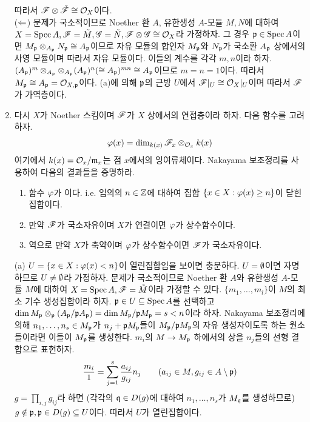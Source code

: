 \begin{enumerate}[label=\tb{5.\arabic*.},itemindent=0mm,itemsep=4mm]
	따라서 $\mathscr{F}\otimes\check{\mathscr{F}}\cong\mathcal{O}_X$이다.\\
	($\Leftarrow$) 문제가 국소적이므로 Noether 환 $A$, 유한생성 $A$-모듈 $M,N$에 대하여
	$X=\operatorname{Spec} A,\mathscr{F}=\tilde M,\mathscr{G}=\tilde N,\mathscr{F}\otimes\mathscr{G}\cong\mathcal{O}_X$라 가정하자.
	그 경우 $\mathfrak{p}\in\operatorname{Spec} A$이면 $M_{\mathfrak{p}}\otimes_{A_{\mathfrak{p}}}N_{\mathfrak{p}}\cong A_{\mathfrak{p}}$이므로
	자유 모듈의 합인자 $M_{\mathfrak{p}}$와 $N_{\mathfrak{p}}$가 국소환 $A_{\mathfrak{p}}$ 상에서의 사영 모듈이며 따라서 자유 모듈이다.
	이들의 계수를 각각 $m,n$이라 하자.
	$(A_{\mathfrak{p}})^m\otimes_{A_{\mathfrak{p}}}\otimes_{A_{\mathfrak{p}}}(A_{\mathfrak{p}})^n(\cong A_{\mathfrak{p}})^{mn}\cong A_{\mathfrak{p}}$이므로 $m=n=1$이다.
	따라서 $M_{\mathfrak{p}}\cong A_{\mathfrak{p}}=\mathcal{O}_{X,\mathfrak{p}}$이다.
	(a)에 의해 $\mathfrak{p}$의 근방 $U$에서 $\mathscr{F}|_U\cong\mathcal{O}_X|_U$이며 따라서 $\mathscr{F}$가 가역층이다.
	\item 다시 $X$가 Noether 스킴이며 $\mathscr{F}$가 $X$ 상에서의 연접층이라 하자. 다음 함수를 고려하자.
	$$\varphi(x)=\dim_{k(x)}\mathscr{F}_x\otimes_{\mathcal{O}_x}k(x)$$
	여기에서 $k(x)=\mathcal{O}_x/\mathfrak{m}_x$는 점 $x$에서의 잉여류체이다. Nakayama 보조정리를 사용하여 다음의 결과들을 증명하라.
	\begin{enumerate}[label=(\alph*)]
	\item 함수 $\varphi$가 이다.
	i.e. 임의의 $n\in\mathbb Z$에 대하여 집합 $\{x\in X:\varphi(x)\ge n\}$이 닫힌집합이다.
	\item 만약 $\mathscr{F}$가 국소자유이며 $X$가 연결이면 $\varphi$가 상수함수이다.
	\item 역으로 만약 $X$가 축약이며 $\varphi$가 상수함수이면 $\mathscr{F}$가 국소자유이다.
	\end{enumerate}
	\sol (a) $U=\{x\in X:\varphi(x)<n\}$이 열린집합임을 보이면 충분하다. $U=\emptyset$이면 자명하므로 $U\ne\emptyset$라 가정하자.
	문제가 국소적이므로 Noether 환 $A$와 유한생성 $A$-모듈 $M$에 대하여 $X=\operatorname{Spec} A,\mathscr{F}=\tilde M$이라 가정할 수 있다.
	$\{m_1,\ldots,m_l\}$이 $M$의 최소 기수 생성집합이라 하자.
	$\mathfrak{p}\in U\subseteq\operatorname{Spec} A$를 선택하고 $\dim M_{\mathfrak{p}}\otimes_{\mathfrak{p}}(A_{\mathfrak{p}}/\mathfrak{p}A_{\mathfrak{p}})
	=\dim M_{\mathfrak{p}}/\mathfrak{p}M_{\mathfrak{p}}=s<n$이라 하자.
	Nakayama 보조정리에 의해 $n_1,\ldots,n_s\in M_{\mathfrak{p}}$가 $n_j+\mathfrak{p}M_{\mathfrak{p}}$들이
	$M_{\mathfrak{p}}/\mathfrak{p}M_{\mathfrak{p}}$의 자유 생성자이도록 하는 원소들이라면 이들이 $M_{\mathfrak{p}}$를 생성한다.
	$m_i$의 $M\rightarrow M_{\mathfrak{p}}$ 하에서의 상을 $n_j$들의 선형 결합으로 표현하자.
	$$\frac{m_i}1=\sum_{j=1}^s\frac{a_{ij}}{g_{ij}}n_j\qquad(a_{ij}\in M,g_{ij}\in A\setminus\mathfrak{p})$$
	$g=\prod_{i,j}g_{ij}$라 하면 (각각의 $\mathfrak{q}\in D(g)$에 대하여 $n_1,\ldots,n_s$가 $M_{\mathfrak{q}}$를 생성하므로)
	$g\notin\mathfrak{p},\mathfrak{p}\in D(g)\subseteq U$이다. 따라서 $U$가 열린집합이다.\\

\end{enumerate}
